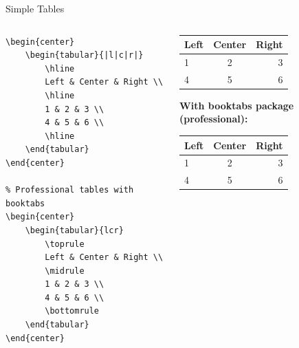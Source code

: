 \begin{frame}[fragile]{Simple Tables}
    \begin{columns}
        \begin{column}{0.5\textwidth}
            \begin{lstlisting}
\begin{center}
    \begin{tabular}{|l|c|r|}
        \hline
        Left & Center & Right \\
        \hline
        1 & 2 & 3 \\
        4 & 5 & 6 \\
        \hline
    \end{tabular}
\end{center}

% Professional tables with booktabs
\begin{center}
    \begin{tabular}{lcr}
        \toprule
        Left & Center & Right \\
        \midrule
        1 & 2 & 3 \\
        4 & 5 & 6 \\
        \bottomrule
    \end{tabular}
\end{center}
            \end{lstlisting}
        \end{column}
        
        \begin{column}{0.5\textwidth}
            \begin{center}
                \begin{tabular}{|l|c|r|}
                    \hline
                    Left & Center & Right \\
                    \hline
                    1 & 2 & 3 \\
                    4 & 5 & 6 \\
                    \hline
                \end{tabular}
            \end{center}
            
            \textbf{With booktabs package (professional):}
            \begin{center}
                \begin{tabular}{lcr}
                    \toprule
                    Left & Center & Right \\
                    \midrule
                    1 & 2 & 3 \\
                    4 & 5 & 6 \\
                    \bottomrule
                \end{tabular}
            \end{center}
            

\end{column}
\end{columns}
\end{frame}
